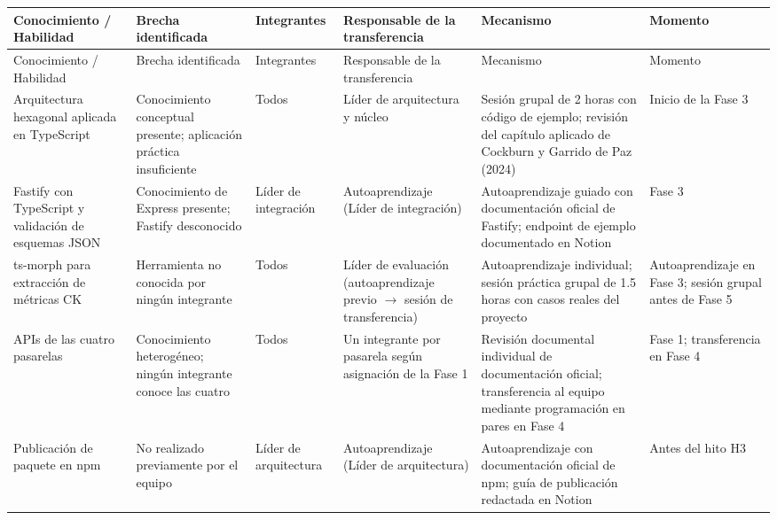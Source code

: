 \begin{center}
\renewcommand{\arraystretch}{1.2}
\SinNumero
\begin{longtable}{|P{0.167}|P{0.162}|P{0.181}|P{0.185}|P{0.185}|P{0.12}|}
  \hline
  Conocimiento / Habilidad & Brecha identificada & Integrantes & Responsable de la transferencia & Mecanismo & Momento \\
  \hline
  \endfirsthead
  \hline
  Conocimiento / Habilidad & Brecha identificada & Integrantes & Responsable de la transferencia & Mecanismo & Momento \\
  \hline
  \endhead
  Arquitectura hexagonal aplicada en TypeScript & Conocimiento conceptual presente; aplicación práctica insuficiente & Todos & Líder de arquitectura y núcleo & Sesión grupal de 2 horas con código de ejemplo; revisión del capítulo aplicado de Cockburn y Garrido de Paz (2024) & Inicio de la Fase 3 \\
  \hline
  Fastify con TypeScript y validación de esquemas JSON & Conocimiento de Express presente; Fastify desconocido & Líder de integración & \hspace{0pt}Auto\-aprendizaje (Líder de integración) & Autoaprendizaje guiado con documentación oficial de Fastify; endpoint de ejemplo documentado en Notion & Fase 3 \\
  \hline
  ts-morph para extracción de métricas CK & Herramienta no conocida por ningún integrante & Todos & Líder de evaluación (\hspace{0pt}auto\-apren\-di\-zaje previo $\rightarrow$ sesión de transferencia) & Autoaprendizaje individual; sesión práctica grupal de 1.5 horas con casos reales del proyecto & \hspace{0pt}Auto\-apren\-di\-zaje en Fase 3; sesión grupal antes de Fase 5 \\
  \hline
  APIs de las cuatro pasarelas & Conocimiento heterogéneo; ningún integrante conoce las cuatro & Todos & Un integrante por pasarela según asignación de la Fase 1 & Revisión documental individual de documentación oficial; transferencia al equipo mediante programación en pares en Fase 4 & Fase 1; transferencia en Fase 4 \\
  \hline
  Publicación de paquete en npm & No realizado previamente por el equipo & Líder de arquitectura & \hspace{0pt}Auto\-aprendizaje (Líder de arquitectura) & Autoaprendizaje con documentación oficial de npm; guía de publicación redactada en Notion & Antes del hito H3 \\
  \hline
\end{longtable}
\end{center}


